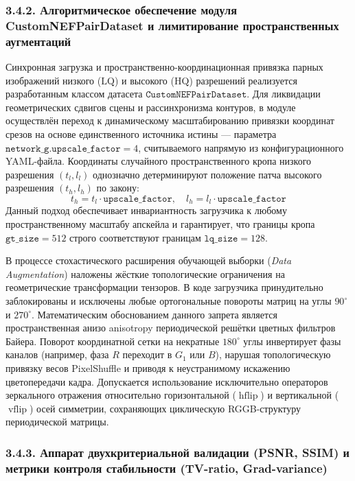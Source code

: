 \documentclass[12pt,a4paper]{article}
\begin{document}
\subsubsection{3.4.2. Алгоритмическое обеспечение модуля CustomNEFPairDataset и лимитирование пространственных аугментаций}

Синхронная загрузка и пространственно-координационная привязка парных изображений низкого ($\text{LQ}$) и высокого ($\text{HQ}$) разрешений реализуется разработанным классом датасета $\texttt{CustomNEFPairDataset}$. Для ликвидации геометрических сдвигов сцены и рассинхронизма контуров, в модуле осуществлён переход к динамическому масштабированию привязки координат срезов на основе единственного источника истины --- параметра $\texttt{network\_g.upscale\_factor} = 4$, считываемого напрямую из конфигурационного YAML-файла. Координаты случайного пространственного кропа низкого разрешения $(t_l, l_l)$ однозначно детерминируют положение патча высокого разрешения $(t_h, l_h)$ по закону:
\begin{equation}
t_h = t_l \cdot \texttt{upscale\_factor}, \quad l_h = l_l \cdot \texttt{upscale\_factor}
\end{equation}
Данный подход обеспечивает инвариантность загрузчика к любому пространственному масштабу апскейла и гарантирует, что границы кропа $\texttt{gt\_size} = 512$ строго соответствуют границам $\texttt{lq\_size} = 128$.

В процессе стохастического расширения обучающей выборки (\textit{Data Augmentation}) наложены жёсткие топологические ограничения на геометрические трансформации тензоров. В коде загрузчика принудительно заблокированы и исключены любые ортогональные повороты матриц на углы $90^\circ$ и $270^\circ$. Математическим обоснованием данного запрета является пространственная анизо anisotropy периодической решётки цветных фильтров Байера. Поворот координатной сетки на некратные $180^\circ$ углы инвертирует фазы каналов (например, фаза $R$ переходит в $G_1$ или $B$), нарушая топологическую привязку весов PixelShuffle и приводя к неустранимому искажению цветопередачи кадра. Допускается использование исключительно операторов зеркального отражения относительно горизонтальной ($\operatorname{hflip}$) и вертикальной ($\operatorname{vflip}$) осей симметрии, сохраняющих циклическую RGGB-структуру периодической матрицы.

\subsubsection{3.4.3. Аппарат двухкритериальной валидации (PSNR, SSIM) и метрики контроля стабильности (TV-ratio, Grad-variance)}
\end{document}
